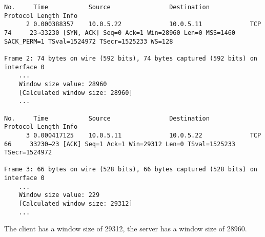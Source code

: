 \begin{verbatim}
No.     Time           Source                Destination           Protocol Length Info
      2 0.000388357    10.0.5.22             10.0.5.11             TCP      74     23→33230 [SYN, ACK] Seq=0 Ack=1 Win=28960 Len=0 MSS=1460 SACK_PERM=1 TSval=1524972 TSecr=1525233 WS=128

Frame 2: 74 bytes on wire (592 bits), 74 bytes captured (592 bits) on interface 0
    ...
    Window size value: 28960
    [Calculated window size: 28960]
    ...

No.     Time           Source                Destination           Protocol Length Info
      3 0.000417125    10.0.5.11             10.0.5.22             TCP      66     33230→23 [ACK] Seq=1 Ack=1 Win=29312 Len=0 TSval=1525233 TSecr=1524972

Frame 3: 66 bytes on wire (528 bits), 66 bytes captured (528 bits) on interface 0
    ...
    Window size value: 229
    [Calculated window size: 29312]
    ...

\end{verbatim}

The client has a window size of 29312, the server has a window size of 28960.
